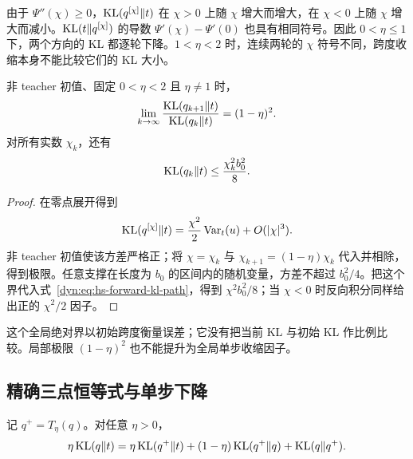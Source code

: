 由于 $\Psi''(\chi)\geq0$，$\operatorname{KL}(q^{[\chi]}\Vert t)$ 在 $\chi>0$ 上随 $\chi$ 增大而增大，在 $\chi<0$ 上随 $\chi$ 增大而减小。$\operatorname{KL}(t\Vert q^{[\chi]})$ 的导数 $\Psi'(\chi)-\Psi'(0)$ 也具有相同符号。因此 $0<\eta\leq1$ 下，两个方向的 KL 都逐轮下降。$1<\eta<2$ 时，连续两轮的 $\chi$ 符号不同，跨度收缩本身不能比较它们的 KL 大小。

\begin{corollary}[局部 KL 速率与全局绝对界]
非 teacher 初值、固定 $0<\eta<2$ 且 $\eta\neq1$ 时，
\begin{equation*}
 \lim_{k\to\infty}
 \frac{\operatorname{KL}(q_{k+1}\Vert t)}{\operatorname{KL}(q_k\Vert t)}
 =(1-\eta)^2.
\end{equation*}
对所有实数 $\chi_k$，还有
\begin{equation*}
 \operatorname{KL}(q_k\Vert t)\leq\frac{\chi_k^2b_0^2}{8}.
\end{equation*}
\end{corollary}

\begin{proof}
在零点展开得到
\begin{equation*}
 \operatorname{KL}(q^{[\chi]}\Vert t)
 =\frac{\chi^2}{2}\operatorname{Var}_{t}(u)+O(|\chi|^3).
\end{equation*}
非 teacher 初值使该方差严格正；将 $\chi=\chi_k$ 与 $\chi_{k+1}=(1-\eta)\chi_k$ 代入并相除，得到极限。任意支撑在长度为 $b_0$ 的区间内的随机变量，方差不超过 $b_0^2/4$。把这个界代入式~\eqref{dyn:eq:hs-forward-kl-path}，得到 $\chi^2b_0^2/8$；当 $\chi<0$ 时反向积分同样给出正的 $\chi^2/2$ 因子。
\end{proof}

这个全局绝对界以初始跨度衡量误差；它没有把当前 KL 与初始 KL 作比例比较。局部极限 $(1-\eta)^2$ 也不能提升为全局单步收缩因子。

\subsection{精确三点恒等式与单步下降}

\begin{theorem}
\label{dyn:thm:hs-three-point}
记 $q^+=T_\eta(q)$。对任意 $\eta>0$，
\begin{equation}\label{dyn:eq:hs-three-point}
 \eta\operatorname{KL}(q\Vert t)
 =\eta\operatorname{KL}(q^+\Vert t)
 +(1-\eta)\operatorname{KL}(q^+\Vert q)
 +\operatorname{KL}(q\Vert q^+).
\end{equation}
\end{theorem}

